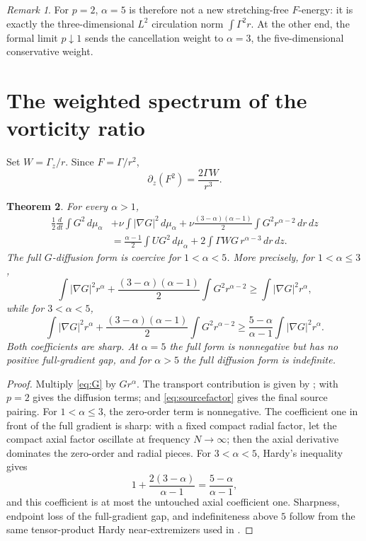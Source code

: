 \documentclass[11pt]{article}
\numberwithin{equation}{section}
\newtheorem{theorem}{Theorem}[section]
\theoremstyle{remark}
\newtheorem{remark}[theorem]{Remark}
\begin{document}
\begin{remark}
For \(p=2\), \(\alpha=5\) is therefore not a new stretching-free \(F\)-energy: it is exactly the three-dimensional \(L^2\) circulation norm \(\int\Gamma^2r\).  At the other end, the formal limit \(p\downarrow1\) sends the cancellation weight to \(\alpha=3\), the five-dimensional conservative weight.
\end{remark}

\section{The weighted spectrum of the vorticity ratio}

Set \(W=\Gamma_z/r\).  Since \(F=\Gamma/r^2\),
\begin{equation}\label{eq:sourcefactor}
 \partial_z(F^2)=\frac{2\Gamma W}{r^3}.
\end{equation}

\begin{theorem}\label{thm:Gidentity}
For every \(\alpha>1\),
\begin{align}
 \frac12\frac d{dt}\int G^2\,d\mu_\alpha
 &+\nu\int|\nabla G|^2\,d\mu_\alpha
 +\nu\frac{(3-\alpha)(\alpha-1)}2
 \int G^2r^{\alpha-2}\,dr\,dz\nonumber\\
 &=\frac{\alpha-1}{2}\int UG^2\,d\mu_\alpha
 +2\int \Gamma WG\,r^{\alpha-3}\,dr\,dz.
 \label{eq:Gweighted}
\end{align}
The full \(G\)-diffusion form is coercive for \(1<\alpha<5\).  More precisely, for \(1<\alpha\le3\),
\[
 \int|\nabla G|^2r^\alpha
 +\frac{(3-\alpha)(\alpha-1)}2\int G^2r^{\alpha-2}
 \ge \int|\nabla G|^2r^\alpha,
\]
while for \(3<\alpha<5\),
\begin{equation}\label{eq:Ggap}
 \int|\nabla G|^2r^\alpha
 +\frac{(3-\alpha)(\alpha-1)}2\int G^2r^{\alpha-2}
 \ge\frac{5-\alpha}{\alpha-1}\int|\nabla G|^2r^\alpha.
\end{equation}
Both coefficients are sharp.  At \(\alpha=5\) the full form is nonnegative but has no positive full-gradient gap, and for \(\alpha>5\) the full diffusion form is indefinite.
\end{theorem}

\begin{proof}
Multiply \eqref{eq:G} by \(G r^\alpha\).  The transport contribution is given by ;  with \(p=2\) gives the diffusion terms; and \eqref{eq:sourcefactor} gives the final source pairing.  For \(1<\alpha\le3\), the zero-order term is nonnegative.  The coefficient one in front of the full gradient is sharp: with a fixed compact radial factor, let the compact axial factor oscillate at frequency \(N\to\infty\); then the axial derivative dominates the zero-order and radial pieces.  For \(3<\alpha<5\), Hardy's inequality gives
\[
 1+\frac{2(3-\alpha)}{\alpha-1}=\frac{5-\alpha}{\alpha-1},
\]
and this coefficient is at most the untouched axial coefficient one.  Sharpness, endpoint loss of the full-gradient gap, and indefiniteness above \(5\) follow from the same tensor-product Hardy near-extremizers used in .
\end{proof}
\end{document}
